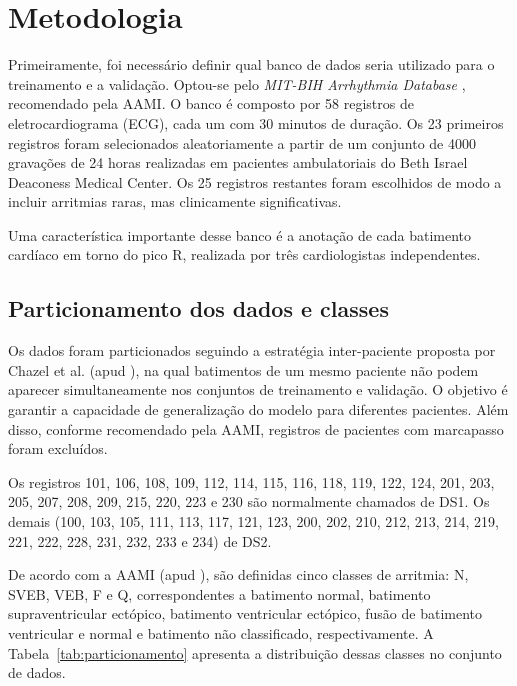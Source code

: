 \chapter{Metodologia}

Primeiramente, foi necessário definir qual banco de dados seria utilizado para o treinamento e a validação. Optou-se pelo \textit{MIT-BIH Arrhythmia Database} \cite{mitbih2005}, recomendado pela AAMI. O banco é composto por 58 registros de eletrocardiograma (ECG), cada um com 30 minutos de duração. Os 23 primeiros registros foram selecionados aleatoriamente a partir de um conjunto de 4000 gravações de 24 horas realizadas em pacientes ambulatoriais do Beth Israel Deaconess Medical Center. Os 25 registros restantes foram escolhidos de modo a incluir arritmias raras, mas clinicamente significativas.

Uma característica importante desse banco é a anotação de cada batimento cardíaco em torno do pico R, realizada por três cardiologistas independentes.

\section{Particionamento dos dados e classes}
\label{sec:particionamento}

Os dados foram particionados seguindo a estratégia inter-paciente proposta por Chazel et al. (apud ), na qual batimentos de um mesmo paciente não podem aparecer simultaneamente nos conjuntos de treinamento e validação. O objetivo é garantir a capacidade de generalização do modelo para diferentes pacientes. Além disso, conforme recomendado pela AAMI, registros de pacientes com marcapasso foram excluídos.  

Os registros 101, 106, 108, 109, 112, 114, 115, 116, 118, 119, 122, 124, 201, 203, 205, 207, 208, 209, 215, 220, 223 e 230 são normalmente chamados de DS1. Os demais (100, 103, 105, 111, 113, 117, 121, 123, 200, 202, 210, 212, 213, 214, 219, 221, 222, 228, 231, 232, 233 e 234) de DS2.

De acordo com a AAMI (apud ), são definidas cinco classes de arritmia: N, SVEB, VEB, F e Q, correspondentes a batimento normal, batimento supraventricular ectópico, batimento ventricular ectópico, fusão de batimento ventricular e normal e batimento não classificado, respectivamente. A Tabela~\ref{tab:particionamento} apresenta a distribuição dessas classes no conjunto de dados.

